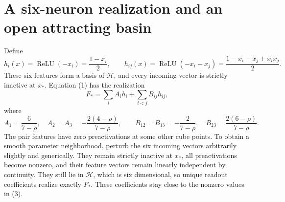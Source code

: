 \documentclass[11pt]{article}
\newcommand{\relu}{\operatorname{ReLU}}
\begin{document}
\section{A six-neuron realization and an open attracting basin}
Define
\[
 h_i(x)=\relu(-x_i)=\frac{1-x_i}{2},\qquad
 h_{ij}(x)=\relu(-x_i-x_j)
       =\frac{1-x_i-x_j+x_ix_j}{2}.
\]
These six features form a basis of $\mathcal H$, and every incoming
vector is strictly inactive at $x_*$. Equation (1) has the realization
\[
 F_* =\sum_i A_i h_i+\sum_{i<j}B_{ij}h_{ij},
\]
where
\[
 A_1=\frac6{7-\rho},\quad A_2=A_3=-\frac{2(4-\rho)}{7-\rho},\qquad
 B_{12}=B_{13}=-\frac2{7-\rho},\quad
 B_{23}=\frac{2(6-\rho)}{7-\rho}.                         \tag{3}
\]
The pair features have zero preactivations at some other cube points.
To obtain a smooth parameter neighborhood, perturb the six incoming
vectors arbitrarily slightly and generically. They remain strictly
inactive at $x_*$, all preactivations become nonzero, and their feature
vectors remain linearly independent by continuity. They still lie in
$\mathcal H$, which is six dimensional, so unique readout coefficients
realize exactly $F_*$. These coefficients stay close to the nonzero
values in (3).
\end{document}
